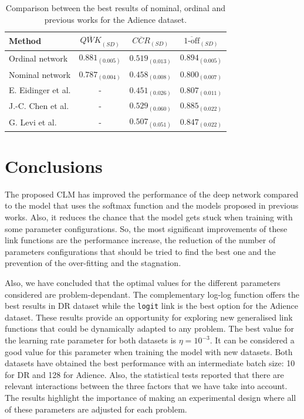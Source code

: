 \documentclass[journal]{IEEEtran}
\begin{document}
	\begin{table}[!t]
		\caption{Comparison between the best results of nominal, ordinal and previous works for the Adience dataset.}
		\label{table:ComparisonAdience}
		\scriptsize
		\centering
		\def\arraystretch{1.3}
		\begin{tabular}{lccc}
			\hline
			\hline
			Method                                    & $\overline{QWK}_{(SD)}$ & $\overline{CCR}_{(SD)}$ & $\overline{\text{1-off}}_{(SD)}$ \\ \hline
			Ordinal network                           &    $0.881_{(0.005)}$    &    $0.519_{(0.013)}$    &        $0.894_{(0.005)}$         \\
			Nominal network                           &    $0.787_{(0.004)}$    &    $0.458_{(0.008)}$    &        $0.800_{(0.007)}$         \\
			E. Eidinger et al. \cite{eidinger2014age} &            -            &    $0.451_{(0.026)}$    &        $0.807_{(0.011)}$         \\
			J.-C. Chen et al. \cite{chen2016cascaded} &            -            &    $0.529_{(0.060)}$    &        $0.885_{(0.022)}$         \\
			G. Levi et al. \cite{levi2015age}         &            -            &    $0.507_{(0.051)}$    &        $0.847_{(0.022)}$		 \\
			\hline
			\hline
		\end{tabular}
	\end{table}
	
	\section{Conclusions}
	\label{sect:conclusions}
	The proposed CLM has improved the performance of the deep network compared to the model that uses the softmax function and the models proposed in previous works. Also, it reduces the chance that the model gets stuck when training with some parameter configurations. So, the most significant improvements of these link functions are the performance increase, the reduction of the number of parameters configurations that should be tried to find the best one and the prevention of the over-fitting and the stagnation. 
	
	Also, we have concluded that the optimal values for the different parameters considered are problem-dependant. The complementary log-log function offers the best results in DR dataset while the \texttt{logit} link is the best option for the Adience dataset. These results provide an opportunity for exploring new generalised link functions that could be dynamically adapted to any problem. The best value for the learning rate parameter for both datasets is $\eta = 10^{-3}$. It can be considered a good value for this parameter when training the model with new datasets. Both datasets have obtained the best performance with an intermediate batch size: 10 for DR and 128 for Adience. 	Also, the statistical tests reported that there are relevant interactions between the three factors that we have take into account. The results highlight the importance of making an experimental design where all of these parameters are adjusted for each problem.
	
\end{document}

